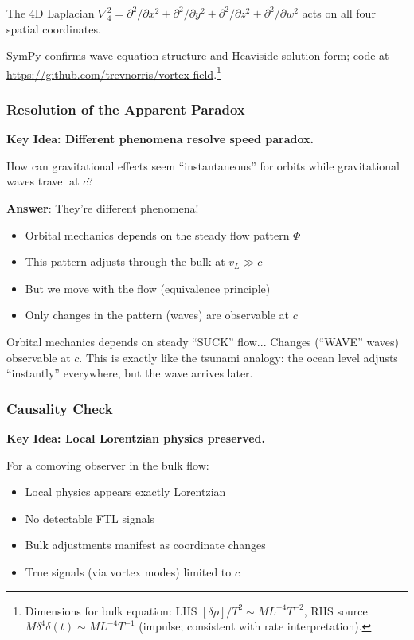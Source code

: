 The 4D Laplacian $\nabla_4^2 = \partial^2/\partial x^2 + \partial^2/\partial y^2 + \partial^2/\partial z^2 + \partial^2/\partial w^2$ acts on all four spatial coordinates.

SymPy confirms wave equation structure and Heaviside solution form; code at \url{https://github.com/trevnorris/vortex-field}.\footnote{Dimensions for bulk equation: LHS $[\delta\rho] / T^2 \sim M L^{-4} T^{-2}$, RHS source $M \delta^4 \delta(t) \sim M L^{-4} T^{-1}$ (impulse; consistent with rate interpretation).}

\subsubsection{Resolution of the Apparent Paradox}

\textbf{Key Idea: Different phenomena resolve speed paradox.}

How can gravitational effects seem ``instantaneous'' for orbits while gravitational waves travel at $c$?

\textbf{Answer}: They're different phenomena!
\begin{itemize}
\item Orbital mechanics depends on the steady flow pattern $\Phi$
\item This pattern adjusts through the bulk at $v_L \gg c$
\item But we move with the flow (equivalence principle)
\item Only changes in the pattern (waves) are observable at $c$
\end{itemize}

Orbital mechanics depends on steady ``SUCK'' flow... Changes (``WAVE'' waves) observable at $c$. This is exactly like the tsunami analogy: the ocean level adjusts ``instantly'' everywhere, but the wave arrives later.

\subsubsection{Causality Check}

\textbf{Key Idea: Local Lorentzian physics preserved.}

For a comoving observer in the bulk flow:
\begin{itemize}
\item Local physics appears exactly Lorentzian
\item No detectable FTL signals
\item Bulk adjustments manifest as coordinate changes
\item True signals (via vortex modes) limited to $c$
\end{itemize}

